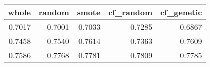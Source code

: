 \begin{tabular}{rrrrr}
\toprule

 whole &  random &  smote &  cf\_random &  cf\_genetic \\
\midrule

0.7017 &  0.7001 & 0.7033 &     0.7285 &      0.6867 \\
0.7458 &  0.7540 & 0.7614 &     0.7363 &      0.7609 \\
0.7586 &  0.7768 & 0.7781 &     0.7809 &      0.7785 \\

\bottomrule
\end{tabular}
